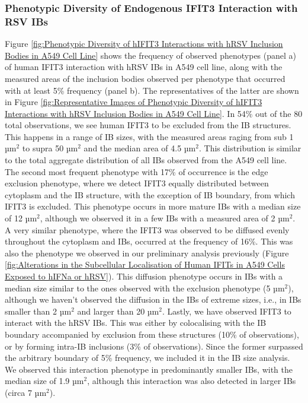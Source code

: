 \subsubsection{Phenotypic Diversity of Endogenous IFIT3 Interaction with RSV IBs}
Figure \ref{fig:Phenotypic Diversity of hIFIT3 Interactions with hRSV Inclusion Bodies in A549 Cell Line} shows the frequency of observed phenotypes (panel a) of human IFIT3 interaction with hRSV IBs in A549 cell line, along with the measured areas of the inclusion bodies observed per phenotype that occurred with at least 5\% frequency (panel b). The representatives of the latter are shown in Figure \ref{fig:Representative Images of Phenotypic Diversity of hIFIT3 Interactions with hRSV Inclusion Bodies in A549 Cell Line}. In 54\% out of the 80 total observations, we see human IFIT3 to be excluded from the IB structures. This happens in a range of IB sizes, with the measured areas raging from sub 1 \(\mbox{µm}^2\) to supra 50 \(\mbox{µm}^2\) and the median area of 4.5 \(\mbox{µm}^2\). This distribution is similar to the total aggregate distribution of all IBs observed from the A549 cell line. The second most frequent phenotype with 17\% of occurrence is the edge exclusion phenotype, where we detect IFIT3 equally distributed between cytoplasm and the IB structure, with the exception of IB boundary, from which IFIT3 is excluded. This phenotype occurs in more mature IBs with a median size of 12 \(\mbox{µm}^2\), although we observed it in a few IBs with a measured area of 2 \(\mbox{µm}^2\). A very similar phenotype, where the IFIT3 was observed to be diffused evenly throughout the cytoplasm and IBs, occurred at the frequency of 16\%. This was also the phenotype we observed in our preliminary analysis previously (Figure \ref{fig:Alterations in the Subcellular Localisation of Human IFITs in A549 Cells Exposed to hIFNa or hRSV}). This diffusion phenotype occurs in IBs with a median size similar to the ones observed with the exclusion phenotype (5 \(\mbox{µm}^2\)), although we haven't observed the diffusion in the IBs of extreme sizes, i.e., in IBs smaller than 2 \(\mbox{µm}^2\) and larger than 20 \(\mbox{µm}^2\). Lastly, we have observed IFIT3 to interact with the hRSV IBs. This was either by colocalising with the IB boundary accompanied by exclusion from these structures (10\% of observations), or by forming intra-IB inclusions (3\% of observations). Since the former surpassed the arbitrary boundary of 5\% frequency, we included it in the IB size analysis. We observed this interaction phenotype in predominantly smaller IBs, with the median size of 1.9 \(\mbox{µm}^2\), although this interaction was also detected in larger IBs (circa 7 \(\mbox{µm}^2\)).

